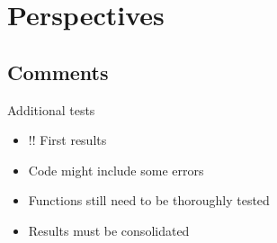 \documentclass[10pt,table,dvipsnames,compress]{beamer}
\begin{document}
\section{Perspectives}
\label{sec:org4f93844}

\subsection{Comments}
\label{sec:org223b2fb}

\begin{frame}[label={sec:orgc887f58}]{Additional tests}
\begin{itemize}
\item \alert{!! First results}
\item Code might include some errors
\item Functions still need to be thoroughly tested
\item Results must be consolidated
\end{itemize}
\end{frame}
\end{document}
